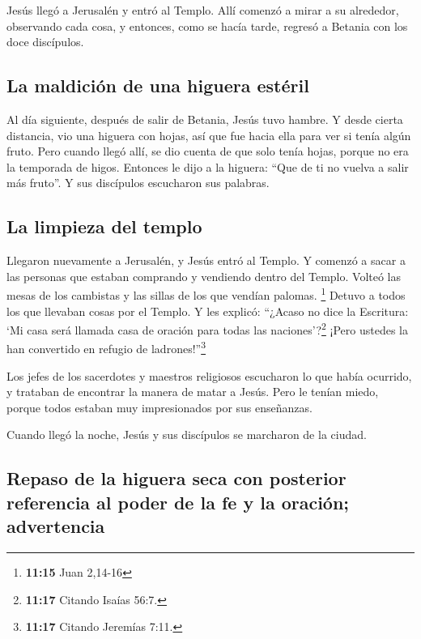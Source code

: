  Jesús llegó a Jerusalén y entró al Templo. Allí comenzó
a mirar a su alrededor, observando cada cosa, y entonces, como se hacía
tarde, regresó a Betania con los doce discípulos.

\hypertarget{la-maldiciuxf3n-de-una-higuera-estuxe9ril}{%
\subsection{La maldición de una higuera
estéril}\label{la-maldiciuxf3n-de-una-higuera-estuxe9ril}}

 Al día siguiente, después de salir de Betania, Jesús
tuvo hambre.  Y desde cierta distancia, vio una higuera
con hojas, así que fue hacia ella para ver si tenía algún fruto. Pero
cuando llegó allí, se dio cuenta de que solo tenía hojas, porque no era
la temporada de higos.  Entonces le dijo a la higuera:
``Que de ti no vuelva a salir más fruto''. Y sus discípulos escucharon
sus palabras.

\hypertarget{la-limpieza-del-templo}{%
\subsection{La limpieza del templo}\label{la-limpieza-del-templo}}

 Llegaron nuevamente a Jerusalén, y Jesús entró al
Templo. Y comenzó a sacar a las personas que estaban comprando y
vendiendo dentro del Templo. Volteó las mesas de los cambistas y las
sillas de los que vendían palomas. \footnote{\textbf{11:15} Juan 2,14-16}
 Detuvo a todos los que llevaban cosas por el Templo.
 Y les explicó: ``¿Acaso no dice la Escritura: `Mi casa
será llamada casa de oración para todas las naciones'?\footnote{\textbf{11:17}
  Citando Isaías 56:7.} ¡Pero ustedes la han convertido en refugio de
ladrones!''\footnote{\textbf{11:17} Citando Jeremías 7:11.}

 Los jefes de los sacerdotes y maestros religiosos
escucharon lo que había ocurrido, y trataban de encontrar la manera de
matar a Jesús. Pero le tenían miedo, porque todos estaban muy
impresionados por sus enseñanzas.

 Cuando llegó la noche, Jesús y sus discípulos se
marcharon de la ciudad.

\hypertarget{repaso-de-la-higuera-seca-con-posterior-referencia-al-poder-de-la-fe-y-la-oraciuxf3n-advertencia}{%
\subsection{Repaso de la higuera seca con posterior referencia al poder
de la fe y la oración;
advertencia}\label{repaso-de-la-higuera-seca-con-posterior-referencia-al-poder-de-la-fe-y-la-oraciuxf3n-advertencia}}

